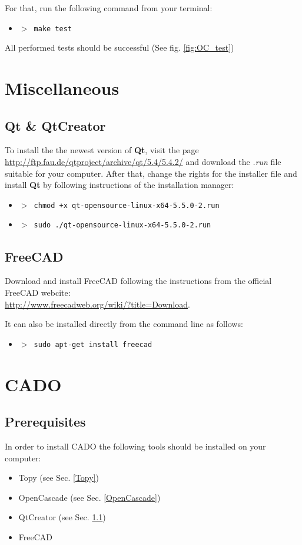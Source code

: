\documentclass[
12pt, %
a4paper, %
oneside, %
headinclude,footinclude, %
BCOR5mm, %
]{scrartcl}
\begin{document}
For that, run the following command from your terminal:
\begin{itemize}
\item[] \texttt{\textbf{$>$ }make test}
\end{itemize}
All performed tests should be successful (See fig. \ref{fig:OC_test})

\section{Miscellaneous}
\subsection{Qt \& QtCreator}
\label{Qt}
To install the the newest version of \textbf{Qt}, visit the page \\ \href{http://ftp.fau.de/qtproject/archive/qt/5.4/5.4.2/}{http://ftp.fau.de/qtproject/archive/qt/5.4/5.4.2/} and download the \textit{.run} file suitable for your computer. 
After that, change the rights for the installer file and install \textbf{Qt} by following instructions of the installation manager:
\begin{itemize}
\item[] \texttt{\textbf{$>$ }chmod +x qt-opensource-linux-x64-5.5.0-2.run}
\item[] \texttt{\textbf{$>$ }sudo ./qt-opensource-linux-x64-5.5.0-2.run}
\end{itemize}
\subsection{FreeCAD}
Download and install FreeCAD following the instructions from the official FreeCAD webcite: \\ \href{http://www.freecadweb.org/wiki/?title=Download}{http://www.freecadweb.org/wiki/?title=Download}.

It can also be installed directly from the command line as follows:
\begin{itemize}
\item[] \texttt{\textbf{$>$ }sudo apt-get install freecad}
\end{itemize}

\section{CADO}
\subsection{Prerequisites}
In order to install CADO the following tools should be installed on your computer:
\begin{itemize}
	\item Topy (see Sec. \ref{Topy})
	\item OpenCascade (see Sec. \ref{OpenCascade})
	\item QtCreator (see Sec. \ref{Qt})
	\item FreeCAD
	\end{itemize}
\end{document}
